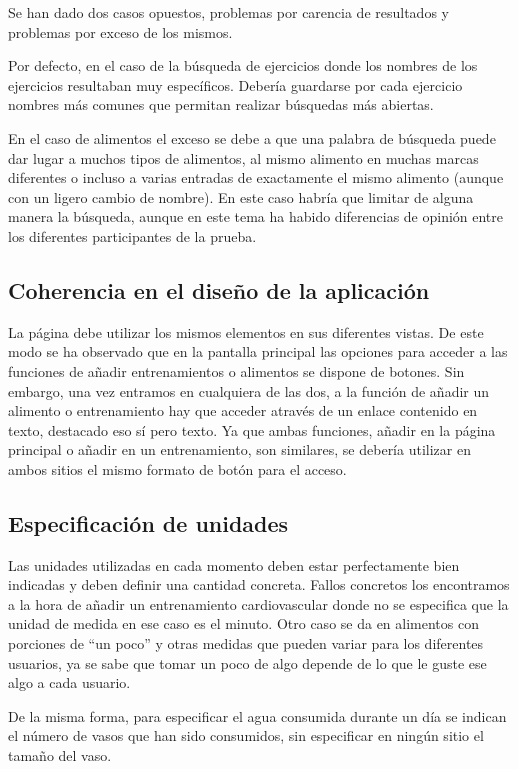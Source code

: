 \documentclass[a4paper]{article}
\begin{document}
	Se han dado dos casos opuestos, problemas por carencia de resultados y problemas por exceso de los mismos.
	
	Por defecto, en el caso de la búsqueda de ejercicios donde los nombres de los ejercicios resultaban muy específicos. Debería guardarse por cada ejercicio nombres más comunes que permitan realizar búsquedas más abiertas.
	
	En el caso de alimentos el exceso se debe a que una palabra de búsqueda puede dar lugar a muchos tipos de alimentos, al mismo alimento en muchas marcas diferentes o incluso a varias entradas de exactamente el mismo alimento (aunque con un ligero cambio de nombre). En este caso habría que limitar de alguna manera la búsqueda, aunque en este tema ha habido diferencias de opinión entre los diferentes participantes de la prueba.
	
	\subsection{Coherencia en el diseño de la aplicación}
	
	La página debe utilizar los mismos elementos en sus diferentes vistas. De este modo se ha observado que en la pantalla principal las opciones para acceder a las funciones de añadir entrenamientos o alimentos se dispone de botones. Sin embargo, una vez entramos en cualquiera de las dos, a la función de añadir un alimento o entrenamiento hay que acceder através de un enlace contenido en texto, destacado eso sí pero texto. Ya que ambas funciones, añadir en la página principal o añadir en un entrenamiento, son similares, se debería utilizar en ambos sitios el mismo formato de botón para el acceso.
	
	\subsection{Especificación de unidades}
	
	Las unidades utilizadas en cada momento deben estar perfectamente bien indicadas y deben definir una cantidad concreta. Fallos concretos los encontramos a la hora de añadir un entrenamiento cardiovascular donde no se especifica que la unidad de medida en ese caso es el minuto. Otro caso se da en alimentos con porciones de ``un poco'' y otras medidas que pueden variar para los diferentes usuarios, ya se sabe que tomar un poco de algo depende de lo que le guste ese algo a cada usuario.
	
	De la misma forma, para especificar el agua consumida durante un día se indican el número de vasos que han sido consumidos, sin especificar en ningún sitio el tamaño del vaso.
	
\end{document}
